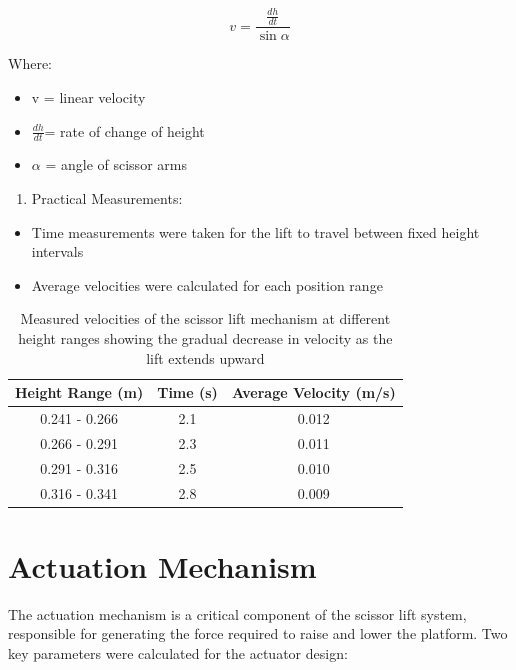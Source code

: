 \documentclass[../../main]{subfiles}
\begin{document}
\begin{equation}
  v = \frac{\frac{dh}{dt}}{\sin \alpha}
\end{equation}

Where:

\begin{itemize}
\item
  v = linear velocity
\item
  \(\frac{dh}{dt}\)= rate of change of height
\item
  $\alpha$ = angle of scissor arms
\end{itemize}

\begin{enumerate}
\def\labelenumi{\arabic{enumi}.}
\item
  Practical Measurements:
\end{enumerate}

\begin{itemize}
\item
  Time measurements were taken for the lift to travel between fixed
  height intervals
\item
  Average velocities were calculated for each position range
\end{itemize}

\begin{table}[h!]
  \centering
  \begin{tabular}{|c|c|c|}
      \hline \rowcolor{red!20}
      \textbf{Height Range (m)} & \textbf{Time (s)} & \textbf{Average Velocity (m/s)} \\ \hline
      0.241 - 0.266 & 2.1 & 0.012 \\ \hline
      0.266 - 0.291 & 2.3 & 0.011 \\ \hline
      0.291 - 0.316 & 2.5 & 0.010 \\ \hline
      0.316 - 0.341 & 2.8 & 0.009 \\ \hline
  \end{tabular}
  \caption{Measured velocities of the scissor lift mechanism at different height ranges showing the gradual decrease in velocity as the lift extends upward}
\end{table}

\section{Actuation Mechanism}

The actuation mechanism is a critical component of the scissor lift
system, responsible for generating the force required to raise and lower
the platform. Two key parameters were calculated for the actuator
design:
\end{document}
